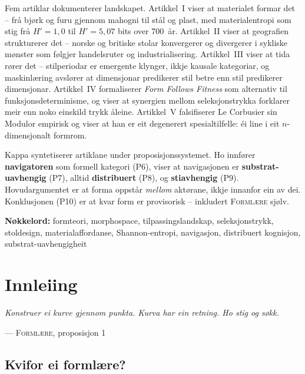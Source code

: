 \documentclass[12pt,a4paper,oneside]{report}
\begin{document}
Fem artiklar dokumenterer landskapet. Artikkel~I viser at materialet formar det -- frå bjørk og furu gjennom mahogni til stål og plast, med materialentropi som stig frå $H' = 1{,}0$ til $H' = 5{,}07$ bits over 700~år. Artikkel~II viser at geografien strukturerer det -- norske og britiske stolar konvergerer og divergerer i sykliske mønster som følgjer handelsruter og industrialisering. Artikkel~III viser at tida rører det -- stilperiodar er emergente klynger, ikkje kausale kategoriar, og maskinlæring avslører at dimensjonar predikerer stil betre enn stil predikerer dimensjonar. Artikkel~IV formaliserer \emph{Form Follows Fitness} som alternativ til funksjonsdeterminisme, og viser at synergien mellom seleksjonstrykka forklarer meir enn noko einskild trykk åleine. Artikkel~V falsifiserer Le Corbusier sin Modulor empirisk og viser at han er eit degenerert spesialtilfelle: éi line i eit $n$-dimensjonalt formrom.

Kappa syntetiserer artiklane under proposisjonssystemet. Ho innfører \textbf{navigatoren} som formell kategori (P6), viser at navigasjonen er \textbf{substrat-uavhengig} (P7), alltid \textbf{distribuert} (P8), og \textbf{stiavhengig} (P9). Hovudargumentet er at forma oppstår \emph{mellom} aktørane, ikkje innanfor ein av dei. Konklusjonen (P10) er at kvar form er provisorisk -- inkludert \textsc{Formlære} sjølv.

\vspace{1cm}
\noindent\textbf{Nøkkelord:} formteori, morphospace, tilpassingslandskap, seleksjonstrykk, stoldesign, materialaffordanse, Shannon-entropi, navigasjon, distribuert kognisjon, substrat-uavhengigheit

\tableofcontents

\chapter{Innleiing}
\label{ch:innleiing}

\epigraph{\itshape Konstruer ei kurve gjennom punkta. Kurva har ein retning. Ho stig og søkk.}{--- \textsc{Formlære}, proposisjon 1}

\section{Kvifor ei formlære?}
\end{document}
